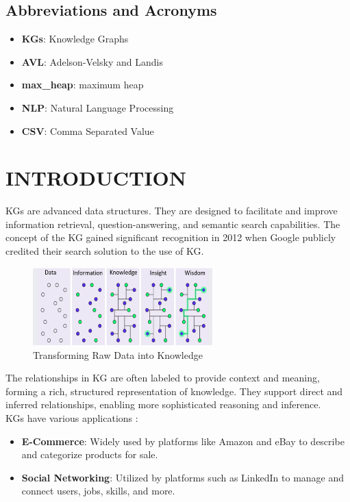 \documentclass[conference]{IEEEtran}
\begin{document}
\subsection{Abbreviations and Acronyms}\label{AA}

\begin{itemize}
    \item \textbf{KGs}: Knowledge Graphs
    \item \textbf{AVL}: Adelson-Velsky and Landis
    \item \textbf{max\_heap}: maximum heap
    \item \textbf{NLP}: Natural Language Processing
    \item \textbf{CSV}: Comma Separated Value
\end{itemize}


\section{INTRODUCTION}
KGs are advanced data structures. They are designed to facilitate and improve information retrieval, question-answering, and semantic search capabilities.
The concept of the KG gained significant recognition in 2012 when Google \cite{b7} publicly credited their search solution to the use of KG.


\begin{figure}[htbp]
\centering
\includegraphics[width=0.8\linewidth , height=3cm]{intro_dots_image_kg.png }
\caption{Transforming Raw Data\cite{b1} into Knowledge}
\label{fig}
\end{figure}


The relationships in KG are often labeled to provide context and meaning, forming a rich, structured representation of knowledge.
They support direct and inferred relationships, enabling more sophisticated reasoning and inference.
\\KGs have various applications : 
\begin{itemize}
    \item \textbf{E-Commerce}: Widely used by platforms like Amazon\cite{b2, b3} and eBay\cite{b4} to describe and categorize products for sale.
    \item \textbf{Social Networking}: Utilized by platforms such as LinkedIn\cite{b5} to manage and connect users, jobs, skills, and more.
\end{itemize}
\end{document}
